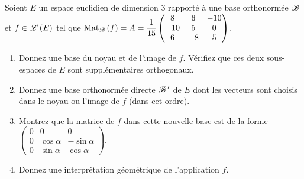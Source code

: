 \begin{exoss}
Soient \(E\) un espace euclidien de dimension \(3\) rapporté à une base orthonormée \(\mathscr{B}\) et \(f\in\mathscr{L}\left(E\right)\) tel que \(\Mat{f}=A=\dfrac{1}{15}\begin{pmatrix}
8 & 6 & -10 \\
-10 & 5 & 0 \\
6 & -8 & 5
\end{pmatrix}\).

\begin{enumerate}
    \item Donnez une base du noyau et de l'image de \(f\). Vérifiez que ces deux sous-espaces de \(E\) sont supplémentaires orthogonaux. \\
    \item Donnez une base orthonormée directe \(\mathscr{B}^{\,\prime}\) de \(E\) dont les vecteurs sont choisis dans le noyau ou l'image de \(f\) (dans cet ordre). \\
    \item Montrez que la matrice de \(f\) dans cette nouvelle base est de la forme \(\begin{pmatrix}
        0 & 0 & 0 \\
        0 & \cos\alpha & -\sin\alpha \\
        0 & \sin\alpha & \cos\alpha
    \end{pmatrix}\). \\
    \item Donnez une interprétation géométrique de l'application \(f\).
\end{enumerate}
\end{exoss}

